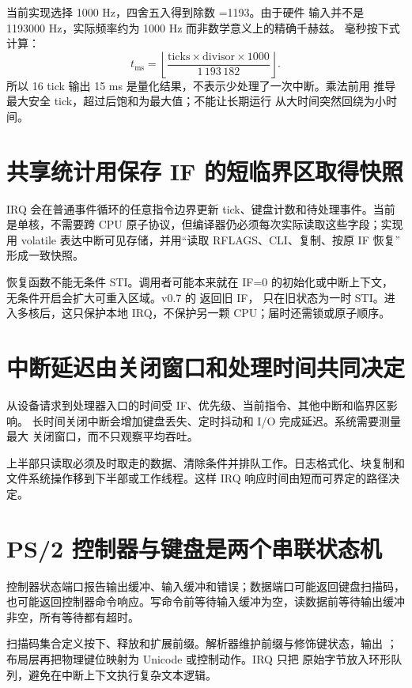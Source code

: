当前实现选择 1000 Hz，四舍五入得到除数 =1193。由于硬件
输入并不是 1193000 Hz，实际频率约为 1000 Hz 而非数学意义上的精确千赫兹。
毫秒按下式计算：
\[
  t_{\mathrm{ms}} =
  \left\lfloor
  \frac{\mathrm{ticks}\times \mathrm{divisor}\times1000}{1\,193\,182}
  \right\rfloor .
\]
所以 16 tick 输出 15 ms 是量化结果，不表示少处理了一次中断。乘法前用
 推导最大安全 tick，超过后饱和为最大值；不能让长期运行
从大时间突然回绕为小时间。

\section{共享统计用保存 IF 的短临界区取得快照}

IRQ 会在普通事件循环的任意指令边界更新 tick、键盘计数和待处理事件。当前
是单核，不需要跨 CPU 原子协议，但编译器仍必须每次实际读取这些字段；实现用
volatile 表达中断可见存储，并用“读取 RFLAGS、CLI、复制、按原 IF 恢复”
形成一致快照。

恢复函数不能无条件 STI。调用者可能本来就在 IF=0 的初始化或中断上下文，
无条件开启会扩大可重入区域。v0.7 的  返回旧 IF，
 只在旧状态为一时 STI。进入多核后，这只保护本地
IRQ，不保护另一颗 CPU；届时还需锁或原子顺序。

\section{中断延迟由关闭窗口和处理时间共同决定}

从设备请求到处理器入口的时间受 IF、优先级、当前指令、其他中断和临界区影响。
长时间关闭中断会增加键盘丢失、定时抖动和 I/O 完成延迟。系统需要测量最大
关闭窗口，而不只观察平均吞吐。

上半部只读取必须及时取走的数据、清除条件并排队工作。日志格式化、块复制和
文件系统操作移到下半部或工作线程。这样 IRQ 响应时间由短而可界定的路径决定。

\section{PS/2 控制器与键盘是两个串联状态机}

控制器状态端口报告输出缓冲、输入缓冲和错误；数据端口可能返回键盘扫描码，
也可能返回控制器命令响应。写命令前等待输入缓冲为空，读数据前等待输出缓冲
非空，所有等待都有超时。

扫描码集合定义按下、释放和扩展前缀。解析器维护前缀与修饰键状态，输出
；布局层再把物理键位映射为 Unicode 或控制动作。IRQ 只把
原始字节放入环形队列，避免在中断上下文执行复杂文本逻辑。

